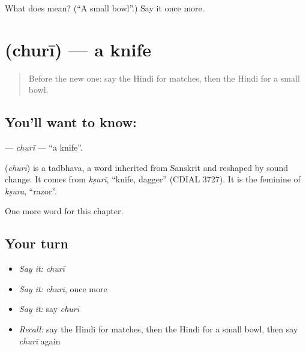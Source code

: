 \begin{tcolorbox}[breakable,colback=teal!4,colframe=teal!35!black,title={Before you move on}]
What does  mean? (\textquotedblleft{}A small bowl\textquotedblright{}.) Say it once more.
\end{tcolorbox}
\section[\texorpdfstring{\hi{छुरी} (churī)}{छुरी (churī)}]{ (churī) — a knife}

\label{lesson:HI-C132-churi}



\begin{quote}
Before the new one: say the Hindi for matches, then the Hindi for a small bowl.
\end{quote}

\subsection*{You'll want to know: }
\textbf{} — \emph{churī} — \textquotedblleft{}a knife\textquotedblright{}.

\begin{cousinweb}
\textbf{} (\emph{churī}) is a tadbhava, a word inherited from Sanskrit and reshaped by sound change. It comes from \emph{kṣurī}, \textquotedblleft{}knife, dagger\textquotedblright{} (CDIAL 3727). It is the feminine of \emph{kṣura}, \textquotedblleft{}razor\textquotedblright{}.
\end{cousinweb}

\begin{grammarlens}[title={What you've built}]
One more word for this chapter.
\end{grammarlens}

\subsection*{Your turn}
\begin{itemize}
\raggedright
  \item \emph{Say it:} \emph{churī}
  \item \emph{Say it:} \emph{churī}, once more
  \item \emph{Say it:} say \emph{churī}
  \item \emph{Recall:} say the Hindi for matches, then the Hindi for a small bowl, then say \emph{churī} again
\end{itemize}

